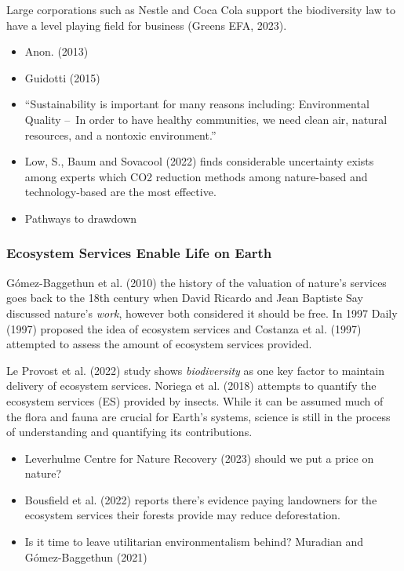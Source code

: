 \documentclass[
  letterpaper,
  DIV=11,
  numbers=noendperiod]{scrartcl}
\providecommand{\tightlist}{%
  \setlength{\itemsep}{0pt}\setlength{\parskip}{0pt}}\usepackage{longtable,booktabs,array}
\begin{document}
Large corporations such as Nestle and Coca Cola support the biodiversity
law to have a level playing field for business (Greens EFA, 2023).

\begin{itemize}
\item
  Anon. (2013)
\item
  Guidotti (2015)
\item
  ``Sustainability is important for many reasons including:
  Environmental Quality --~In order to have healthy communities, we need
  clean air, natural resources, and a nontoxic environment.''
\item
  Low, S., Baum and Sovacool (2022) finds considerable uncertainty
  exists among experts which CO2 reduction methods among nature-based
  and technology-based are the most effective.
\item
  Pathways to drawdown
\end{itemize}

\subsubsection{Ecosystem Services Enable Life on
Earth}\label{ecosystem-services-enable-life-on-earth}

Gómez-Baggethun et al. (2010) the history of the valuation of nature's
services goes back to the 18th century when David Ricardo and Jean
Baptiste Say discussed nature's \emph{work}, however both considered it
should be free. In 1997 Daily (1997) proposed the idea of ecosystem
services and Costanza et al. (1997) attempted to assess the amount of
ecosystem services provided.

Le Provost et al. (2022) study shows \emph{biodiversity} as one key
factor to maintain delivery of ecosystem services. Noriega et al. (2018)
attempts to quantify the ecosystem services (ES) provided by insects.
While it can be assumed much of the flora and fauna are crucial for
Earth's systems, science is still in the process of understanding and
quantifying its contributions.

\begin{itemize}
\tightlist
\item
  Leverhulme Centre for Nature Recovery (2023) should we put a price on
  nature?
\item
  Bousfield et al. (2022) reports there's evidence paying landowners for
  the ecosystem services their forests provide may reduce deforestation.
\item
  Is it time to leave utilitarian environmentalism behind? Muradian and
  Gómez-Baggethun (2021)
\end{itemize}
\end{document}

